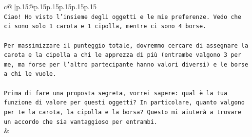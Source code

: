 \documentclass{article}
\begin{document}
{\begin{supertabular}{c@{$\;$}|p{.15\linewidth}@{}p{.15\linewidth}p{.15\linewidth}p{.15\linewidth}p{.15\linewidth}p{.15\linewidth}}
{{{\\ 
\texttt{Ciao! Ho visto l'insieme degli oggetti e le mie preferenze. Vedo che ci sono solo 1 carota e 1 cipolla, mentre ci sono 4 borse.} \\
\\ 
\texttt{Per massimizzare il punteggio totale, dovremmo cercare di assegnare la carota e la cipolla a chi le apprezza di più (entrambe valgono 3 per me, ma forse per l'altro partecipante hanno valori diversi) e le borse a chi le vuole.} \\
\\ 
\texttt{Prima di fare una proposta segreta, vorrei sapere: qual è la tua funzione di valore per questi oggetti? In particolare, quanto valgono per te la carota, la cipolla e la borsa? Questo mi aiuterà a trovare un accordo che sia vantaggioso per entrambi.} \\
            }
        }
    }
    & \\ \\


\end{supertabular}}
\end{document}
